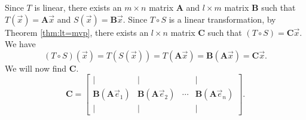 \documentclass[]{book}
\newcommand{\sbvec}[1]{\ensuremath{\vec{e}_#1}}
\newcommand{\mat}[1]{\ensuremath{\mathbf{#1}}}
\begin{document}
Since $T$ is linear, there exists an $m \times n$ matrix $\mat{A}$ and $l \times m$ matrix $\mat{B}$ such that $T(\vec{x}) = \mat{A} \vec{x}$ and $S(\vec{x}) = \mat{B}\vec{x}$. Since $T \circ S$ is a linear transformation, by Theorem \ref{thm:lt=mvp}, there exists an $l \times n$ matrix $\mat{C}$ such that $(T \circ S) = \mat{C}\vec{x}$. We have
\[\left(T\circ S\right)(\vec{x}) = T\left(S\left(\vec{x}\right)\right) = T\left(\mat{A}\vec{x}\right) = \mat{B}\left(\mat{A}\vec{x}\right) = \mat{C}\vec{x}.\]
We will now find $\mat{C}$.
\[
    \mat{C} = \begin{bmatrix}\vert & \vert && \vert \\ \mat{B}\left(\mat{A}\sbvec{1}\right) & \mat{B}\left(\mat{A}\sbvec{2}\right) & \cdots & \mat{B}\left(\mat{A}\sbvec{n}\right) \\ \vert & \vert && \vert\end{bmatrix}.
\]
\end{document}
